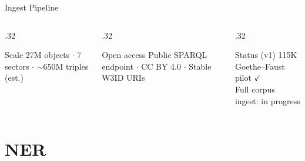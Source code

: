 \documentclass[xcolor,aspectratio=169,compress]{beamer}
\begin{document}
\begin{frame}{Ingest Pipeline}
  \begin{columns}
    \begin{column}{.32\textwidth}
      \begin{block}{Scale}
        \footnotesize
        27M objects $\cdot$ 7 sectors $\cdot$
        $\sim$650M triples (est.)
      \end{block}
    \end{column}
    \begin{column}{.32\textwidth}
      \begin{block}{Open access}
        \footnotesize
        Public SPARQL endpoint $\cdot$
        CC BY 4.0 $\cdot$ Stable W3ID URIs
      \end{block}
    \end{column}
    \begin{column}{.32\textwidth}
      \begin{block}{Status (v1)}
        \footnotesize
        115K Goethe--Faust pilot $\checkmark$\\
        Full corpus ingest: in progress
      \end{block}
    \end{column}
  \end{columns}
\end{frame}

\section{NER}
\end{document}

